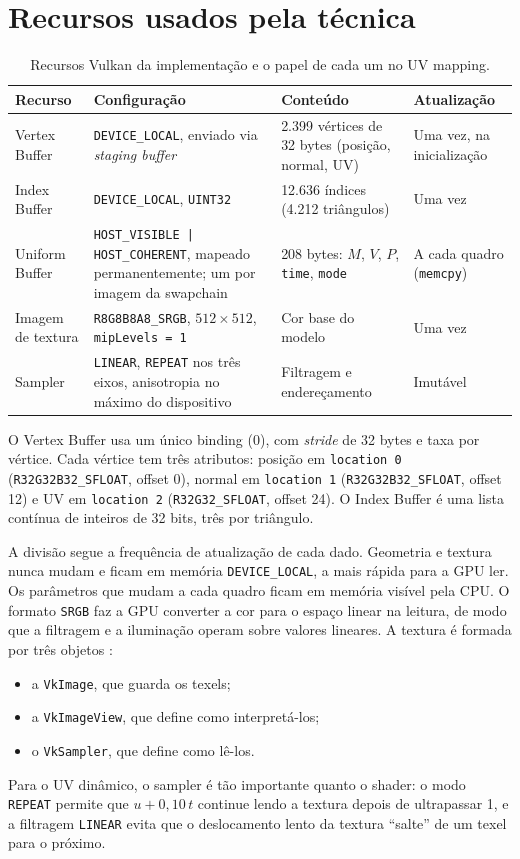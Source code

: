 \section{Recursos usados pela técnica}

\begin{table}[H]
\centering
\caption{Recursos Vulkan da implementação e o papel de cada um no UV mapping.}
\label{tab:recursos-vulkan}
\small
\begin{tabular}{p{2.5cm}p{4.3cm}p{3.5cm}p{3.5cm}}
\toprule
\textbf{Recurso} & \textbf{Configuração} & \textbf{Conteúdo} & \textbf{Atualização} \\
\midrule
Vertex Buffer & \texttt{DEVICE\_LOCAL}, enviado via \textit{staging buffer} & 2.399 vértices de 32 bytes (posição, normal, UV) & Uma vez, na inicialização \\
Index Buffer & \texttt{DEVICE\_LOCAL}, \texttt{UINT32} & 12.636 índices (4.212 triângulos) & Uma vez \\
Uniform Buffer & \texttt{HOST\_VISIBLE | HOST\_COHERENT}, mapeado permanentemente; um por imagem da swapchain & 208 bytes: \(M\), \(V\), \(P\), \texttt{time}, \texttt{mode} & A cada quadro (\texttt{memcpy}) \\
Imagem de textura & \texttt{R8G8B8A8\_SRGB}, \(512\times512\), \texttt{mipLevels = 1} & Cor base do modelo & Uma vez \\
Sampler & \texttt{LINEAR}, \texttt{REPEAT} nos três eixos, anisotropia no máximo do dispositivo & Filtragem e endereçamento & Imutável \\
\bottomrule
\end{tabular}
\end{table}

O Vertex Buffer usa um único binding (0), com \textit{stride} de 32 bytes e taxa por vértice. Cada vértice tem três atributos: posição em \texttt{location 0} (\texttt{R32G32B32\_SFLOAT}, offset 0), normal em \texttt{location 1} (\texttt{R32G32B32\_SFLOAT}, offset 12) e UV em \texttt{location 2} (\texttt{R32G32\_SFLOAT}, offset 24). O Index Buffer é uma lista contínua de inteiros de 32 bits, três por triângulo.

A divisão segue a frequência de atualização de cada dado. Geometria e textura nunca mudam e ficam em memória \texttt{DEVICE\_LOCAL}, a mais rápida para a GPU ler. Os parâmetros que mudam a cada quadro ficam em memória visível pela CPU. O formato \texttt{SRGB} faz a GPU converter a cor para o espaço linear na leitura, de modo que a filtragem e a iluminação operam sobre valores lineares. A textura é formada por três objetos \cite{vulkan}:
\begin{itemize}
    \item a \texttt{VkImage}, que guarda os texels;
    \item a \texttt{VkImageView}, que define como interpretá-los;
    \item o \texttt{VkSampler}, que define como lê-los.
\end{itemize}
Para o UV dinâmico, o sampler é tão importante quanto o shader: o modo \texttt{REPEAT} permite que \(u + 0{,}10\,t\) continue lendo a textura depois de ultrapassar 1, e a filtragem \texttt{LINEAR} evita que o deslocamento lento da textura ``salte'' de um texel para o próximo.


